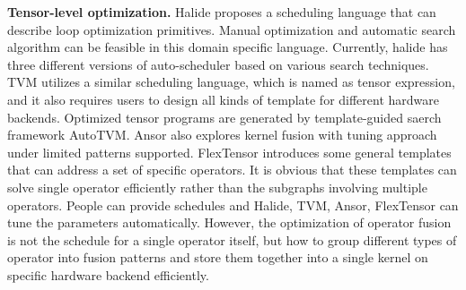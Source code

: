 \textbf{Tensor-level optimization.}
Halide proposes a scheduling language that can describe loop optimization primitives. Manual optimization and automatic search algorithm can be feasible in
this domain specific language. Currently, halide has three different versions of auto-scheduler based on various search techniques. TVM utilizes a similar scheduling
language, which is named as tensor expression, and it also requires users to design all kinds of template for different hardware backends. Optimized tensor programs
are generated by template-guided saerch framework AutoTVM. Ansor also explores kernel fusion
with tuning approach under limited patterns supported. FlexTensor introduces some general templates that can address a set of specific operators. It is obvious that
these templates can solve single operator efficiently rather than the subgraphs involving multiple operators.
People can provide schedules and Halide, TVM, Ansor, FlexTensor can tune the parameters automatically. However, 
the optimization of operator fusion is not the schedule for a single operator itself, but how to group different types of operator into fusion patterns and store 
them together into a single kernel on specific hardware backend efficiently.



\label{sec:result}
